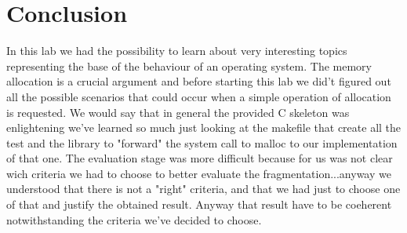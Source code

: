 \documentclass[11pt]{article}
\begin{document}
\section{Conclusion}
In this lab we had the possibility to learn about very interesting topics representing the base of the behaviour of an operating system. The memory allocation is a crucial argument and before starting this lab we did't figured out all the possible scenarios that could occur when a simple operation of allocation is requested. We would say that in general the provided C skeleton was enlightening we've learned so much just looking at the makefile that create all the test and the library to "forward" the system call to malloc to our implementation of that one. The evaluation stage was more difficult because for us was not clear wich criteria we had to choose to better evaluate the fragmentation...anyway we understood that there is not a "right" criteria, and that we had just to choose one of that and justify the obtained result. Anyway that result have to be coeherent notwithstanding the criteria we've decided to choose.
\end{document}
